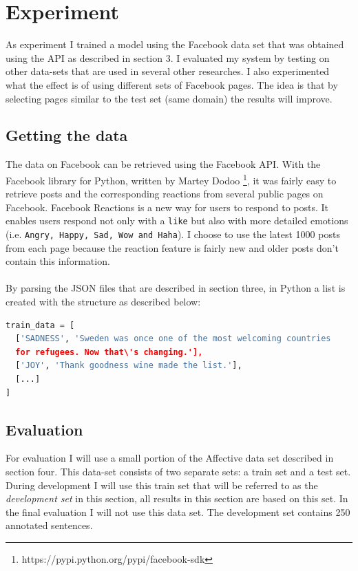 \documentclass[11pt]{article}
\begin{document}
\section{Experiment}
As experiment I trained a model using the Facebook data set that was obtained using the API as described in section 3. I evaluated my system by testing on other data-sets that are used in several other researches. I also experimented what the effect is of using different sets of Facebook pages. The idea is that by selecting pages similar to the test set (same domain) the results will improve.

\subsection{Getting the data}
The data on Facebook can be retrieved using the Facebook API. With the Facebook library for Python, written by Martey Dodoo \footnote{https://pypi.python.org/pypi/facebook-sdk}, it was fairly easy to retrieve posts and the corresponding reactions from several public pages on Facebook. Facebook Reactions is a new way for users to respond to posts. It enables users respond not only with a \texttt{like} but also with more detailed emotions (i.e. \texttt{Angry, Happy, Sad, Wow and Haha}). I choose to use the latest 1000 posts from each page because the reaction feature is fairly new and older posts don't contain this information. \\\\
By parsing the JSON files that are described in section three, in Python a list is created with the structure as described below:
\begin{lstlisting}[language=python]
train_data = [
  ['SADNESS', 'Sweden was once one of the most welcoming countries
  for refugees. Now that\'s changing.'],
  ['JOY', 'Thank goodness wine made the list.'],
  [...]
]
\end{lstlisting}

\subsection{Evaluation}
For evaluation I will use a small portion of the Affective data set described in section four. This data-set consists of two separate sets: a train set and a test set. During development I will use this train set that will be referred to as the \textit{development set} in this section, all results in this section are based on this set. In the final evaluation I will not use this data set. The development set contains 250 annotated sentences.
\end{document}
